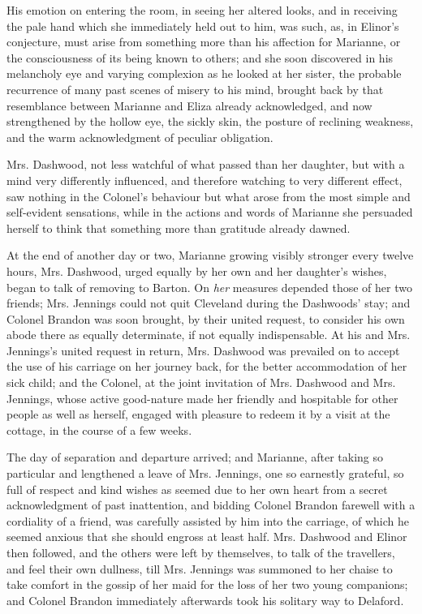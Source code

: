 His emotion on entering the room, in seeing her altered looks, and in receiving the pale hand which she immediately held out to him, was such, as, in Elinor's conjecture, must arise from something more than his affection for Marianne, or the consciousness of its being known to others; and she soon discovered in his melancholy eye and varying complexion as he looked at her sister, the probable recurrence of many past scenes of misery to his mind, brought back by that resemblance between Marianne and Eliza already acknowledged, and now strengthened by the hollow eye, the sickly skin, the posture of reclining weakness, and the warm acknowledgment of peculiar obligation.

Mrs. Dashwood, not less watchful of what passed than her daughter, but with a mind very differently influenced, and therefore watching to very different effect, saw nothing in the Colonel's behaviour but what arose from the most simple and self-evident sensations, while in the actions and words of Marianne she persuaded herself to think that something more than gratitude already dawned.

At the end of another day or two, Marianne growing visibly stronger every twelve hours, Mrs. Dashwood, urged equally by her own and her daughter's wishes, began to talk of removing to Barton. On {\em her} measures depended those of her two friends; Mrs. Jennings could not quit Cleveland during the Dashwoods' stay; and Colonel Brandon was soon brought, by their united request, to consider his own abode there as equally determinate, if not equally indispensable. At his and Mrs. Jennings's united request in return, Mrs. Dashwood was prevailed on to accept the use of his carriage on her journey back, for the better accommodation of her sick child; and the Colonel, at the joint invitation of Mrs. Dashwood and Mrs. Jennings, whose active good-nature made her friendly and hospitable for other people as well as herself, engaged with pleasure to redeem it by a visit at the cottage, in the course of a few weeks.

The day of separation and departure arrived; and Marianne, after taking so particular and lengthened a leave of Mrs. Jennings, one so earnestly grateful, so full of respect and kind wishes as seemed due to her own heart from a secret acknowledgment of past inattention, and bidding Colonel Brandon farewell with a cordiality of a friend, was carefully assisted by him into the carriage, of which he seemed anxious that she should engross at least half. Mrs. Dashwood and Elinor then followed, and the others were left by themselves, to talk of the travellers, and feel their own dullness, till Mrs. Jennings was summoned to her chaise to take comfort in the gossip of her maid for the loss of her two young companions; and Colonel Brandon immediately afterwards took his solitary way to Delaford.

